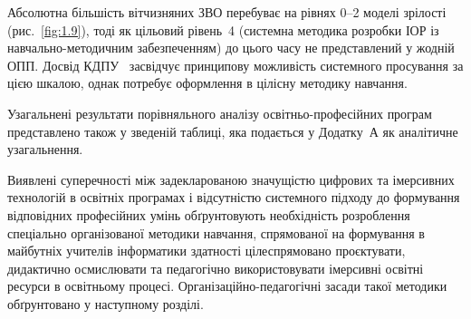 Абсолютна більшість вітчизняних ЗВО перебуває на рівнях 0--2 моделі зрілості (рис.~\ref{fig:1.9}), тоді як цільовий рівень~4 (системна методика розробки ІОР із навчально-методичним забезпеченням) до цього часу не представлений у жодній ОПП. Досвід КДПУ~\cite{Shepiliev2020WebAR, Shepiliev2021Career, Semerikov2022IERDesign, Semerikov2024WebARML_CoSinE} засвідчує принципову можливість системного просування за цією шкалою, однак потребує оформлення в цілісну методику навчання.

Узагальнені результати порівняльного аналізу освітньо-професійних програм представлено також у зведеній таблиці, яка подається у Додатку~А як аналітичне узагальнення.

Виявлені суперечності між задекларованою значущістю цифрових та імерсивних технологій в освітніх програмах і відсутністю системного підходу до формування відповідних професійних умінь обґрунтовують необхідність розроблення спеціально організованої методики навчання, спрямованої на формування в майбутніх учителів інформатики здатності цілеспрямовано проєктувати, дидактично осмислювати та педагогічно використовувати імерсивні освітні ресурси в освітньому процесі. Організаційно-педагогічні засади такої методики обґрунтовано у наступному розділі.

